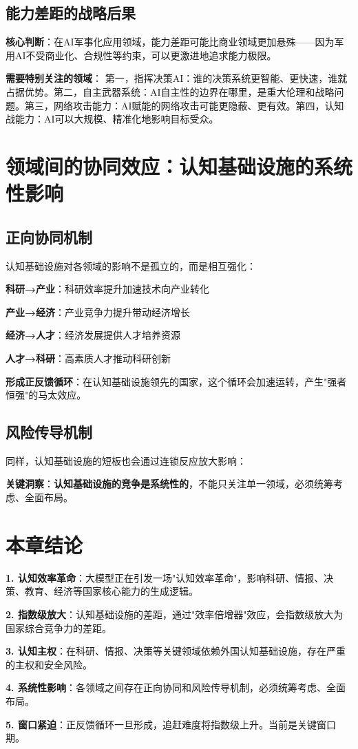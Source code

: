 \subsection{能力差距的战略后果}

\textbf{核心判断}：在AI军事化应用领域，能力差距可能比商业领域更加悬殊——因为军用AI不受商业化、合规性等约束，可以更激进地追求能力极限。

\textbf{需要特别关注的领域}：
第一，指挥决策AI：谁的决策系统更智能、更快速，谁就占据优势。第二，自主武器系统：AI自主性的边界在哪里，是重大伦理和战略问题。第三，网络攻击能力：AI赋能的网络攻击可能更隐蔽、更有效。第四，认知战能力：AI可以大规模、精准化地影响目标受众。

\section{领域间的协同效应：认知基础设施的系统性影响}

\subsection{正向协同机制}

认知基础设施对各领域的影响不是孤立的，而是相互强化：

\textbf{科研→产业}：科研效率提升加速技术向产业转化

\textbf{产业→经济}：产业竞争力提升带动经济增长

\textbf{经济→人才}：经济发展提供人才培养资源

\textbf{人才→科研}：高素质人才推动科研创新

\textbf{形成正反馈循环}：在认知基础设施领先的国家，这个循环会加速运转，产生"强者恒强"的马太效应。

\subsection{风险传导机制}

同样，认知基础设施的短板也会通过连锁反应放大影响：

\textbf{关键洞察}：\textbf{认知基础设施的竞争是系统性的}，不能只关注单一领域，必须统筹考虑、全面布局。

\section{本章结论}

\textbf{1. 认知效率革命}：大模型正在引发一场"认知效率革命"，影响科研、情报、决策、教育、经济等国家核心能力的生成逻辑。

\textbf{2. 指数级放大}：认知基础设施的差距，通过"效率倍增器"效应，会指数级放大为国家综合竞争力的差距。

\textbf{3. 认知主权}：在科研、情报、决策等关键领域依赖外国认知基础设施，存在严重的主权和安全风险。

\textbf{4. 系统性影响}：各领域之间存在正向协同和风险传导机制，必须统筹考虑、全面布局。

\textbf{5. 窗口紧迫}：正反馈循环一旦形成，追赶难度将指数级上升。当前是关键窗口期。

